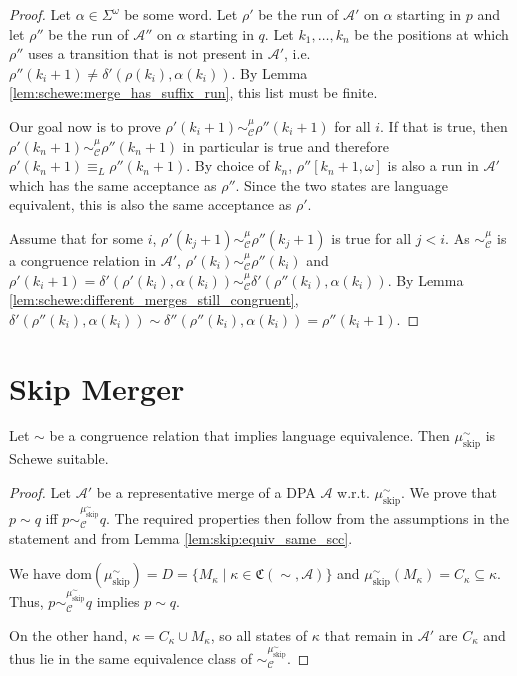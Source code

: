 \begin{proof}
	Let $\alpha \in \Sigma^\omega$ be some word. Let $\rho'$ be the run of $\mathcal{A}'$ on $\alpha$ starting in $p$ and let $\rho''$ be the run of $\mathcal{A}''$ on $\alpha$ starting in $q$. Let $k_1, \dots, k_n$ be the positions at which $\rho''$ uses a transition that is not present in $\mathcal{A}'$, i.e. $\rho''(k_i + 1) \neq \delta'(\rho(k_i), \alpha(k_i))$. By Lemma \ref{lem:schewe:merge_has_suffix_run}, this list must be finite. 
	
	Our goal now is to prove $\rho'(k_i + 1) \sim_\mathcal{C}^\mu \rho''(k_i + 1)$ for all $i$. If that is true, then $\rho'(k_n + 1) \sim_\mathcal{C}^\mu \rho''(k_n + 1)$ in particular is true and therefore $\rho'(k_n + 1) \equiv_L \rho''(k_n + 1)$. By choice of $k_n$, $\rho''[k_n + 1, \omega]$ is also a run in $\mathcal{A}'$ which has the same acceptance as $\rho''$. Since the two states are language equivalent, this is also the same acceptance as $\rho'$.
	
	Assume that for some $i$, $\rho'(k_j + 1) \sim_\mathcal{C}^\mu \rho''(k_j + 1)$ is true for all $j < i$. As $\sim_\mathcal{C}^\mu$ is a congruence relation in $\mathcal{A}'$, $\rho'(k_i) \sim_\mathcal{C}^\mu \rho''(k_i)$ and $\rho'(k_i + 1) = \delta'(\rho'(k_i), \alpha(k_i)) \sim_\mathcal{C}^\mu \delta'(\rho''(k_i), \alpha(k_i))$. By Lemma \ref{lem:schewe:different_merges_still_congruent}, $\delta'(\rho''(k_i), \alpha(k_i)) \sim \delta''(\rho''(k_i), \alpha(k_i)) = \rho''(k_i + 1)$.
\end{proof}


\section{Skip Merger}

\begin{lem}
	Let $\sim$ be a congruence relation that implies language equivalence. Then $\mu_\text{skip}^\sim$ is Schewe suitable.
	\label{lem:schewe:skip_suitable}
\end{lem}

\begin{proof}
	Let $\mathcal{A}'$ be a representative merge of a DPA $\mathcal{A}$ w.r.t. $\mu_\text{skip}^\sim$. We prove that $p \sim q$ iff $p \sim_\mathcal{C}^{\mu_\text{skip}^\sim} q$. The required properties then follow from the assumptions in the statement and from Lemma \ref{lem:skip:equiv_same_scc}.
	
	We have $\text{dom}(\mu_\text{skip}^\sim) = D = \{M_\kappa \mid \kappa \in \mathfrak{C}(\sim, \mathcal{A})\}$ and $\mu_\text{skip}^\sim(M_\kappa) = C_\kappa \subseteq \kappa$. Thus, $p \sim_\mathcal{C}^{\mu_\text{skip}^\sim} q$ implies $p \sim q$.
	
	On the other hand, $\kappa = C_\kappa \cup M_\kappa$, so all states of $\kappa$ that remain in $\mathcal{A}'$ are $C_\kappa$ and thus lie in the same equivalence class of $\sim_\mathcal{C}^{\mu_\text{skip}^\sim}.$
\end{proof}


